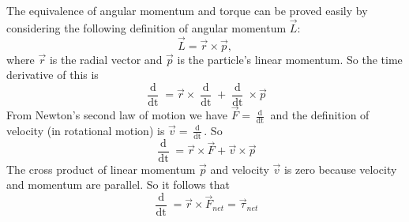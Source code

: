 The equivalence of angular momentum and torque can be proved easily by considering the following definition of angular momentum $\vec{L}$: 
\begin{equation}
    \vec{L} = \vec{r} \times \vec{p},
\end{equation}
where $\vec{r}$ is the radial vector and $\vec{p}$ is the particle's linear momentum. So the time derivative of this is
\begin{equation}
    \frac{\mathop{\mathrm{d}\vec{L}}}{\mathop{\mathrm{d}t}} = \vec{r} \times \frac{\mathop{\mathrm{d}\vec{p}}}{\mathop{\mathrm{d}t}} + \frac{\mathop{\mathrm{d}\vec{r}}}{\mathop{\mathrm{d}t}} \times \vec{p}
\end{equation}
From Newton's second law of motion we have $\vec{F} = \frac{\mathop{\mathrm{d}\vec{p}}}{\mathop{\mathrm{d}t}}$ and the definition of velocity (in rotational motion) is $\vec{v} = \frac{\mathop{\mathrm{d}\vec{r}}}{\mathop{\mathrm{d}t}}$. So
\begin{equation}
    \frac{\mathop{\mathrm{d}\vec{L}}}{\mathop{\mathrm{d}t}} = \vec{r} \times \vec{F} + \vec{v} \times \vec{p}
\end{equation}
The cross product of linear momentum $\vec{p}$ and velocity $\vec{v}$ is zero because velocity and momentum are parallel. So it follows that
\begin{equation}
    \frac{\mathop{\mathrm{d}\vec{L}}}{\mathop{\mathrm{d}t}} = \vec{r} \times \vec{F}_{net} = \vec{\tau}_{net}
\end{equation}


